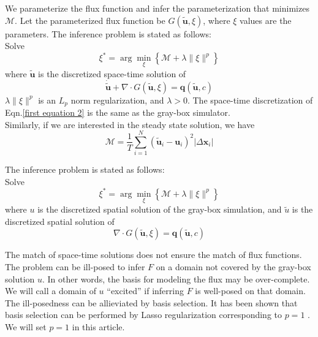 \documentclass[a4paper,onecolumn]{article}
\theoremstyle{remark}
\begin{document}
\indent 
We parameterize the flux function and infer the parameterization that minimizes $\mathcal{M}$.
Let the parameterized flux function be $G(\tilde{\boldsymbol{u}}, \xi)$,
where $\xi$ values are the parameters.
The inference problem is stated as follows:\\

\indent Solve
\begin{equation}
    \xi^* = 
    \arg\min_{\xi} \left\{
    \mathcal{M}
    + \lambda \|\xi\|^p  \right\}
    \label{objective twin model}
\end{equation}
where $\tilde{\boldsymbol{u}}$
is the discretized space-time solution of
\begin{equation}
    \dot{ \tilde{\boldsymbol{u}}} + \nabla \cdot
    G(\tilde{\boldsymbol{u}}, \xi)
    = \boldsymbol{q}(\tilde{\boldsymbol{u}},c)
    \label{first equation 2}
\end{equation}
 $\lambda\|\xi\|^p$
is an $L_p$ norm regularization, and $\lambda>0$.
The space-time discretization of Eqn.\eqref{first equation 2} is the same as the gray-box simulator.
\\

\indent Similarly, if we are interested in the steady state solution,
we have
\begin{equation}
    \mathcal{M} = \frac{1}{T}
    \sum_{i=1}^{N} \left(\tilde{\boldsymbol{u}}_{i} - \boldsymbol{u}_{i}\right)^2
    \left| \Delta \mathbf{x}_i \right|
    \label{minimizer twin model discrete steady}
\end{equation}

\indent The inference problem is stated as follows:\\

\indent Solve
\begin{equation}
    \xi^* = 
    \arg\min_{\xi} \left\{
    \mathcal{M} 
    + \lambda \|\xi\|^p  \right\}
    \label{objective twin model steady}
\end{equation}
where $u$ is the discretized spatial solution of the gray-box simulation, and $\tilde{u}$
is the discretized spatial solution of
\begin{equation}
    \nabla \cdot
    G(\tilde{\boldsymbol{u}}, \xi)
    = \boldsymbol{q}(\tilde{\boldsymbol{u}},c)
    \label{first equation 2 steady}
\end{equation}

\indent The match of space-time solutions does not ensure the match of flux functions.
The problem can be ill-posed to infer $F$ on a domain not covered by the gray-box solution $u$.
In other words, the basis for modeling the flux may be over-complete.
We will call a domain of $u$ ``excited'' if inferring $F$ is well-posed on that domain.
The ill-posedness
can be allieviated by basis selection. It has been shown that basis selection can be performed
by Lasso regularization corresponding to $p=1$ \cite{Lasso variable selection}.
We will set $p=1$ in this article. \\
\end{document}
